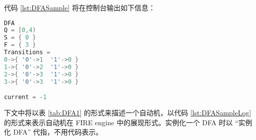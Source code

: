 
代码 \ref{lst:DFASample} 将在控制台输出如下信息：
\lstset{style=mystyle}
\begin{lstlisting}[language=C++,label={lst:DFASampleLog},caption={图\ref{fig:DFA1}中自动机在 FIRE engine 中的表现形式}]
DFA
Q = [0,4)
S = { 0 }
F = { 3 }
Transitions =
0->{ '0'->1  '1'->0 }
1->{ '0'->2  '1'->0 }
2->{ '0'->3  '1'->0 }
3->{ '0'->3  '1'->0 }

current = -1
\end{lstlisting}

下文中将以表 \ref{tab:DFA1} 的形式来描述一个自动机，以代码 \ref{lst:DFASampleLog} 的形式来表示自动机在 FIRE engine 中的展现形式。实例化一个 DFA 时以 “实例化 DFA” 代指，不用代码表示。 
